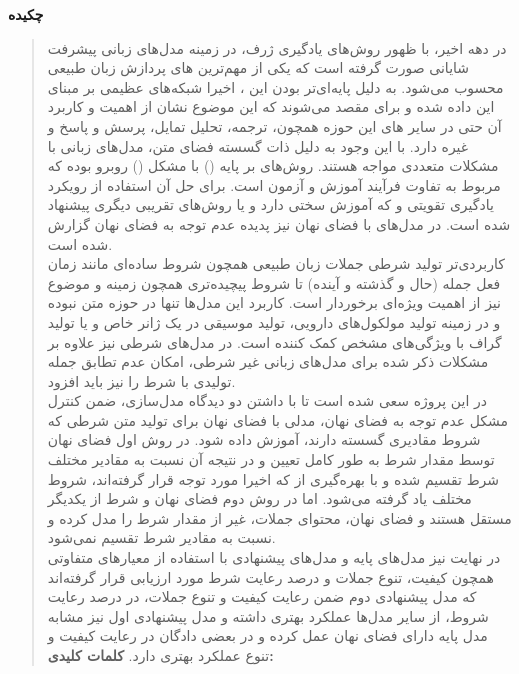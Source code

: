 \thispagestyle{empty}
\centerline{\textbf{\large{چکیده}}}
\begin{quote}
در دهه اخیر، با ظهور روش­‌های یادگیری ژرف، در زمینه مدل‌­های زبانی پیشرفت شایانی صورت گرفته است که یکی از مهم‌ترین \task{}‌های پردازش زبان طبیعی محسوب می‌شود. به دلیل پایه‌ای‌تر بودن این \task{}، اخیرا شبکه‌های عظیمی بر مبنای این \task{}  \pretrain{} داده شده و برای \task{} مقصد \finetuning{} می‌شوند که این موضوع نشان از اهمیت و کاربرد آن حتی در سایر \task{}‌های این حوزه همچون، ترجمه، تحلیل تمایل، پرسش و پاسخ و غیره دارد.
 با این وجود به دلیل ذات گسسته فضای متن، مدل‌های زبانی با مشکلات متعددی مواجه هستند. روش‌های بر پایه \teacherforcing{} () با مشکل \expbias{} () روبرو بوده که مربوط به تفاوت فرآیند آموزش و آزمون است. برای حل آن استفاده از رويکرد يادگيری تقويتی و \gan{} که آموزش سختی دارد و یا روش‌های تقریبی دیگری پيشنهاد شده است. در مدل‌های با فضای نهان نیز پدیده عدم توجه \decoder{} به فضای نهان گزارش شده است.
\\
\task{}
کاربردی‌­تر تولید شرطی جملات زبان طبیعی همچون شروط ساده­‌ای مانند زمان فعل جمله (حال و گذشته و آینده) تا شروط پیچیده‌­تری همچون زمینه و موضوع نیز از اهمیت ویژه‌ای برخوردار است. کاربرد این مدل‌ها تنها در حوزه متن نبوده و در زمینه تولید مولکول‌های دارویی، تولید موسیقی در یک ژانر خاص و یا تولید گراف با ویژگی‌های مشخص کمک کننده است. در مدل‌های شرطی نیز علاوه بر مشکلات ذکر شده برای مدل‌های زبانی غیر شرطی، امکان عدم تطابق جمله تولیدی با شرط را نیز باید افزود.
\\
در این پروژه سعی شده است تا با داشتن دو دیدگاه مدل‌سازی، ضمن کنترل مشکل عدم توجه به فضای نهان، مدلی \generative{} با فضای نهان برای تولید متن شرطی که شروط مقادیری گسسته دارند، آموزش داده شود. در روش اول فضای نهان توسط مقدار شرط به طور کامل تعیین و در نتیجه \priordist{} آن نسبت به مقادیر مختلف شرط تقسیم شده و با بهره‌گیری از \normalizingflownets{} که اخیرا مورد توجه قرار گرفته‌اند، \priordist{} شروط مختلف یاد گرفته می‌شود. اما در روش دوم فضای نهان و شرط از یکدیگر مستقل هستند و فضای نهان، محتوای جملات، غیر از مقدار شرط را مدل کرده و نسبت به مقادیر شرط تقسیم نمی‌شود.
\\
در نهایت نیز مدل‌های پایه و مدل‌های پیشنهادی با استفاده از معیار‌های متفاوتی همچون کیفیت، تنوع جملات و درصد رعایت شرط مورد ارزیابی قرار گرفته‌اند که مدل پیشنهادی دوم ضمن رعایت کیفیت و تنوع جملات، در درصد رعایت شروط، از سایر مدل‌ها عملکرد بهتری داشته و مدل پیشنهادی اول نیز مشابه مدل پایه دارای فضای نهان عمل کرده و در بعضی دادگان در رعایت کیفیت و تنوع عملکرد بهتری دارد.
\vskip 1cm
\textbf{کلمات کلیدی:} 
\end{quote}